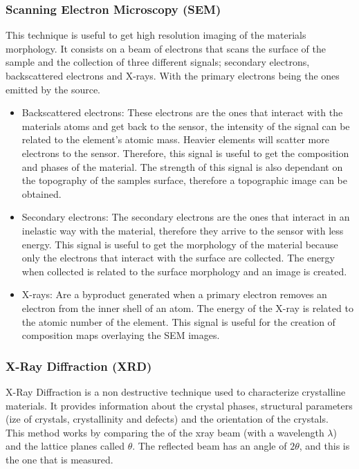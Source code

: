 \documentclass{article}
\begin{document}
\subsubsection{Scanning Electron Microscopy (SEM)}
This technique is useful to get high resolution imaging of the materials morphology.
It consists on a beam of electrons that scans the surface of the sample and the collection of three 
different signals; secondary electrons, backscattered electrons and X-rays. With the primary electrons 
being the ones emitted by the source.\\
\begin {itemize}
\item Backscattered electrons: These electrons are the ones that interact with the materials atoms and get back to
the sensor, the intensity of the signal can be related to the element's atomic mass. Heavier elements will scatter more electrons
to the sensor. Therefore, this signal is useful to get the composition and phases of the material.
The strength of this signal is also dependant on the topography of the samples surface, therefore a topographic image can be obtained.\\
\item Secondary electrons: The secondary electrons are the ones that interact in an inelastic way with the material, therefore they arrive to
the sensor with less energy. This signal is useful to get the morphology of the material because only the electrons that interact with the surface
are collected. The energy when collected is related to the surface morphology and an image is created.\\
\item X-rays: Are a byproduct generated when a primary electron removes an electron from the inner shell of an atom. The energy of the X-ray is related to the
atomic number of the element. This signal is useful for the creation of composition maps overlaying the 
SEM images.\\
\end{itemize}

\subsubsection{X-Ray Diffraction (XRD)}
X-Ray Diffraction is a non destructive technique used to characterize crystalline materials. 
It provides information about the crystal phases, structural parameters (ize of crystals, crystallinity  and defects) and the orientation of the crystals.\\
This method works by comparing the of the xray beam (with a wavelength $\lambda$) and the lattice planes called $\theta$. The reflected beam has an angle of $2\theta$, and this is the one that is measured.
\end{document}
